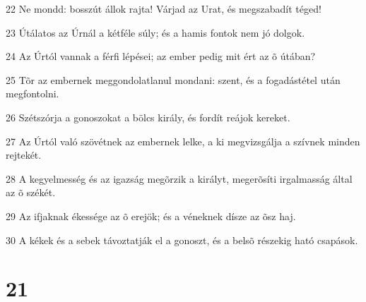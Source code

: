 \par 22 Ne mondd: bosszút állok rajta! Várjad az Urat, és megszabadít téged!
\par 23 Útálatos az Úrnál a kétféle súly; és a hamis fontok nem jó dolgok.
\par 24 Az Úrtól vannak a férfi lépései; az ember pedig mit ért az õ útában?
\par 25 Tõr az embernek meggondolatlanul mondani: szent, és a fogadástétel után megfontolni.
\par 26 Szétszórja a gonoszokat a bölcs király, és fordít reájok kereket.
\par 27 Az Úrtól való szövétnek az embernek lelke, a ki megvizsgálja a szívnek minden rejtekét.
\par 28 A kegyelmesség és az igazság megõrzik a királyt, megerõsíti irgalmasság által az õ székét.
\par 29 Az ifjaknak ékessége az õ erejök; és a véneknek dísze az õsz haj.
\par 30 A kékek és a sebek távoztatják el a gonoszt, és a belsõ részekig  ható csapások.

\chapter{21}

